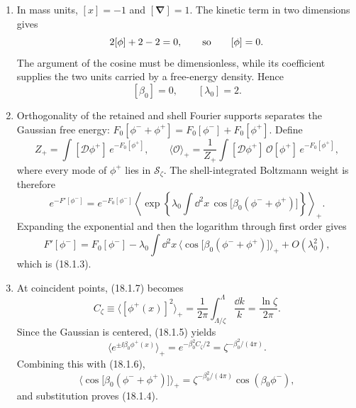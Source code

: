 \providecommand{\Sloop}[4]{%
  \draw[fast] (#1)
    .. controls ($(#1)+({#2-#4}:{#3/(0.75*cos(#4))})$)
    and ($(#1)+({#2+#4}:{#3/(0.75*cos(#4))})$) .. (#1);}

\begin{enumerate}
  \begin{enumerate}
    \item[(a)]
    In mass units, \([x]=-1\) and \([\boldsymbol\nabla]=1\).  The kinetic
    term in two dimensions gives
    \[
      2[\phi]+2-2=0,
      \qquad\hbox{so}\qquad [\phi]=0.
    \]
    The argument of the cosine must be dimensionless, while its coefficient
    supplies the two units carried by a free-energy density.  Hence
    \[
      \boxed{[\beta_0]=0,\qquad [\lambda_0]=2.}
      \tag{18.1.S1}
    \]

    \item[(b)]
    Orthogonality of the retained and shell Fourier supports separates the
    Gaussian free energy:
    \(F_0[\phi^-+\phi^+]=F_0[\phi^-]+F_0[\phi^+]\).  Define
    \[
      Z_+=\int[\mathcal D\phi^+]\,e^{-F_0[\phi^+]},
      \qquad
      \langle\mathcal O\rangle_+
      =\frac{1}{Z_+}\int[\mathcal D\phi^+]\,\mathcal O[\phi^+]\,
        e^{-F_0[\phi^+]},
      \tag{18.1.S2}
    \]
    where every mode of \(\phi^+\) lies in \(\mathcal S_\zeta\).  The
    shell-integrated Boltzmann weight is therefore
    \[
      e^{-F'[\phi^-]}
      =e^{-F_0[\phi^-]}
        \left\langle
          \exp\!\left\{
            \lambda_0\int \dd^2x\,
            \cos\!\bigl[\beta_0(\phi^-+\phi^+)\bigr]
          \right\}
        \right\rangle_+ .
    \]
    Expanding the exponential and then the logarithm through first order
    gives
    \[
      F'[\phi^-]
      =F_0[\phi^-]
       -\lambda_0\int \dd^2x\,
        \bigl\langle
          \cos\!\bigl[\beta_0(\phi^-+\phi^+)\bigr]
        \bigr\rangle_+
       +O(\lambda_0^2),
    \]
    which is (18.1.3).

    \item[(c)]
    At coincident points, (18.1.7) becomes
    \[
      C_\zeta\equiv
      \langle[\phi^+(x)]^2\rangle_+
      =\frac{1}{2\pi}\int_{\Lambda/\zeta}^{\Lambda}\frac{\dd k}{k}
      =\frac{\ln\zeta}{2\pi}.
      \tag{18.1.S3}
    \]
    Since the Gaussian is centered, (18.1.5) yields
    \[
      \bigl\langle e^{\pm \ii\beta_0\phi^+(x)}\bigr\rangle_+
      =e^{-\beta_0^2C_\zeta/2}
      =\zeta^{-\beta_0^2/(4\pi)}.
    \]
    Combining this with (18.1.6),
    \[
      \bigl\langle
        \cos\!\bigl[\beta_0(\phi^-+\phi^+)\bigr]
      \bigr\rangle_+
      =\zeta^{-\beta_0^2/(4\pi)}\cos(\beta_0\phi^-),
    \]
    and substitution proves (18.1.4).


\end{enumerate}
\end{enumerate}
